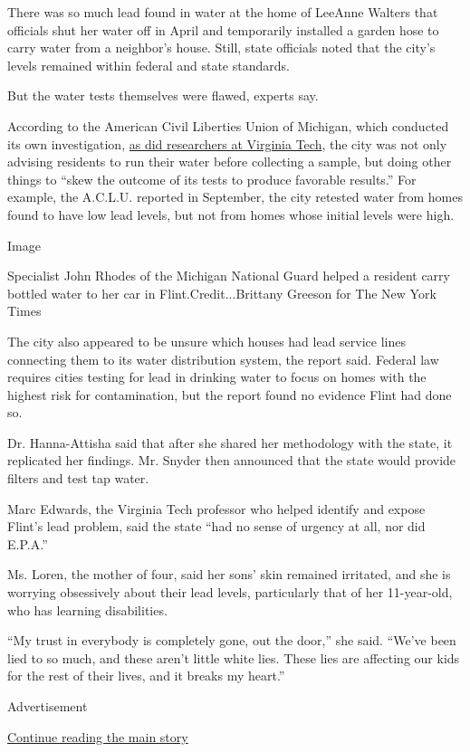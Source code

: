There was so much lead found in water at the home of LeeAnne Walters
that officials shut her water off in April and temporarily installed a
garden hose to carry water from a neighbor's house. Still, state
officials noted that the city's levels remained within federal and state
standards.

But the water tests themselves were flawed, experts say.

According to the American Civil Liberties Union of Michigan, which
conducted its own investigation, \href{http://flintwaterstudy.org/}{as
did researchers at Virginia Tech}, the city was not only advising
residents to run their water before collecting a sample, but doing other
things to ``skew the outcome of its tests to produce favorable
results.'' For example, the A.C.L.U. reported in September, the city
retested water from homes found to have low lead levels, but not from
homes whose initial levels were high.

Image

Specialist John Rhodes of the Michigan National Guard helped a resident
carry bottled water to her car in Flint.Credit...Brittany Greeson for
The New York Times

The city also appeared to be unsure which houses had lead service lines
connecting them to its water distribution system, the report said.
Federal law requires cities testing for lead in drinking water to focus
on homes with the highest risk for contamination, but the report found
no evidence Flint had done so.

Dr. Hanna-Attisha said that after she shared her methodology with the
state, it replicated her findings. Mr. Snyder then announced that the
state would provide filters and test tap water.

Marc Edwards, the Virginia Tech professor who helped identify and expose
Flint's lead problem, said the state ``had no sense of urgency at all,
nor did E.P.A.''

Ms. Loren, the mother of four, said her sons' skin remained irritated,
and she is worrying obsessively about their lead levels, particularly
that of her 11-year-old, who has learning disabilities.

``My trust in everybody is completely gone, out the door,'' she said.
``We've been lied to so much, and these aren't little white lies. These
lies are affecting our kids for the rest of their lives, and it breaks
my heart.''

Advertisement

\protect\hyperlink{after-bottom}{Continue reading the main story}

